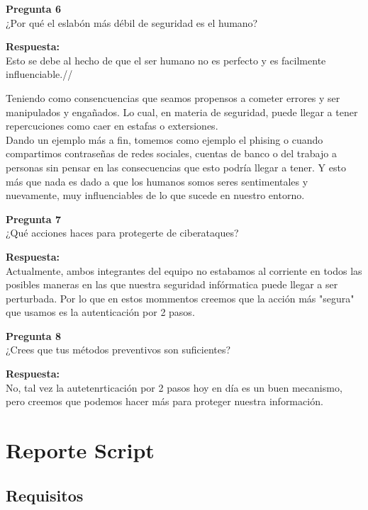 \documentclass{article}
\newenvironment{problem}[2][Pregunta]
    { \begin{mdframed}[backgroundcolor=gray!20] \textbf{#1 #2} \\}
    {  \end{mdframed}}
\newenvironment{solution}
    {\textbf{Respuesta:\\}}
    {}
\begin{document}
\begin{problem}
    {6} ¿Por qué el eslabón más débil de seguridad es el humano?
\end{problem}

\begin{solution}
    Esto se debe al hecho de que el ser humano no es perfecto y es facilmente influenciable.//

    Teniendo como consencuencias que seamos propensos a cometer errores y ser manipulados y engañados. Lo cual, en materia de seguridad, puede llegar a tener repercuciones como caer en estafas o extersiones.\\
    Dando un ejemplo más a fin, tomemos como ejemplo el phising o cuando compartimos contraseñas de redes sociales, cuentas de banco o del trabajo a personas sin pensar en las consecuencias que esto podría llegar a tener. Y esto más que nada es dado a que los humanos somos seres sentimentales y nuevamente, muy influenciables de lo que sucede en nuestro entorno.
    
\end{solution}

\begin{problem}
    {7} ¿Qué acciones haces para protegerte de ciberataques? 
\end{problem}

\begin{solution}
    Actualmente, ambos integrantes del equipo no estabamos al corriente en todos las posibles maneras en las que nuestra seguridad infórmatica puede llegar a ser perturbada. Por lo que en estos mommentos creemos que la acción más "segura" que usamos es la autenticación por 2 pasos.
\end{solution}

\begin{problem}
    {8}  ¿Crees que tus métodos preventivos son suficientes?
\end{problem}

\begin{solution}
    No, tal vez la autetenrticación por 2 pasos hoy en día es un buen mecanismo, pero creemos que podemos hacer más para proteger nuestra información.
\end{solution}

\newpage
\section{Reporte Script}

\subsection{Requisitos}
\end{document}
